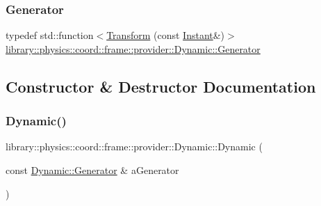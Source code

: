 \subsubsection{\texorpdfstring{Generator}{Generator}}
{\footnotesize\ttfamily typedef std\+::function$<$\hyperlink{classlibrary_1_1physics_1_1coord_1_1_transform}{Transform} (const \hyperlink{classlibrary_1_1physics_1_1time_1_1_instant}{Instant}\&)$>$ \hyperlink{classlibrary_1_1physics_1_1coord_1_1frame_1_1provider_1_1_dynamic_a143db93d5b57faf0e91a812f4203a630}{library\+::physics\+::coord\+::frame\+::provider\+::\+Dynamic\+::\+Generator}}



\subsection{Constructor \& Destructor Documentation}
\mbox{\label{classlibrary_1_1physics_1_1coord_1_1frame_1_1provider_1_1_dynamic_a9969003390848043b95d6ee4f451eade}} 
\subsubsection{\texorpdfstring{Dynamic()}{Dynamic()}}
{\footnotesize\ttfamily library\+::physics\+::coord\+::frame\+::provider\+::\+Dynamic\+::\+Dynamic (\begin{DoxyParamCaption}\item[{const \hyperlink{classlibrary_1_1physics_1_1coord_1_1frame_1_1provider_1_1_dynamic_a143db93d5b57faf0e91a812f4203a630}{Dynamic\+::\+Generator} \&}]{a\+Generator }\end{DoxyParamCaption})}

\mbox{\label{classlibrary_1_1physics_1_1coord_1_1frame_1_1provider_1_1_dynamic_abca1b794d3c6a306fcbc1eef091330b7}} 
